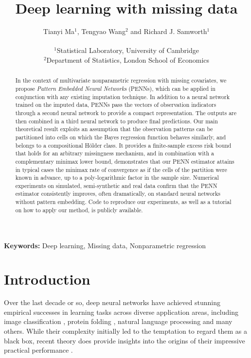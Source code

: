 \documentclass[12pt]{article}
\title{Deep learning with missing data}
\author{Tianyi Ma$^1$, Tengyao Wang$^2$ and Richard J. Samworth$^{1}$\\ \\
$^1$Statistical Laboratory, University of Cambridge\\
$^2$Department of Statistics, London School of Economics
}
\date{}
\begin{document}
	
\maketitle

\begin{abstract}
In the context of multivariate nonparametric regression with missing covariates, we propose \emph{Pattern Embedded Neural Networks} (PENNs), which can be applied in conjunction with any existing imputation technique.  In addition to a neural network trained on the imputed data, PENNs pass the vectors of observation indicators through a second neural network to provide a compact representation.  The outputs are then combined in a third neural network to produce final predictions.  Our main theoretical result exploits an assumption that the observation patterns can be partitioned into cells on which the Bayes regression function behaves similarly, and belongs to a compositional H\"older class.  It provides a finite-sample excess risk bound that holds for an arbitrary missingness mechanism, and in combination with a complementary minimax lower bound, demonstrates that our PENN estimator attains in typical cases the minimax rate of convergence as if the cells of the partition were known in advance, up to a poly-logarithmic factor in the sample size.  Numerical experiments on simulated, semi-synthetic and real data confirm that the PENN estimator consistently improves, often dramatically, on standard neural networks without pattern embedding.  Code to reproduce our experiments, as well as a tutorial on how to apply our method, is publicly available.
\end{abstract}
\noindent\textbf{Keywords:} Deep learning, Missing data, Nonparametric regression

\section{Introduction}

Over the last decade or so, deep neural networks have achieved stunning empirical successes in learning tasks across diverse application areas, including image classification \citep{krizhevsky2012imagenet,he2016deep}, protein folding \citep{jumper2021highly}, natural language processing \citep{vaswani2017attention,devlin2019bert} and many others.  While their complexity initially led to the temptation to regard them as a black box, recent theory does provide insights into the origins of their impressive practical performance \citep{jacot2018neural,schmidt-hieber2020nonparametric,kohler2021rate,mei2022generalization,suh2024survey}. 
\end{document}
